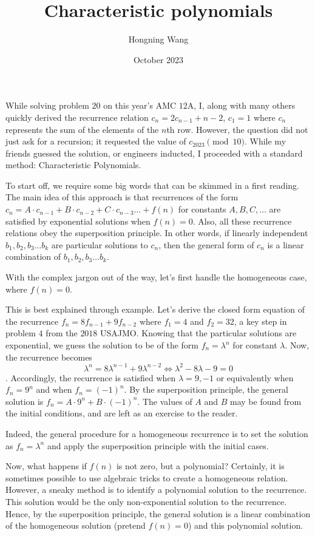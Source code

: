 \documentclass{article}
\title{Characteristic polynomials}
\author{Hongning Wang}
\date{October 2023}
\begin{document}
\maketitle

While solving problem $20$ on this year's AMC $12$A, I, along with many others quickly derived the recurrence relation $c_n = 2c_{n-1}+n-2$, $c_1 = 1$ where $c_n$ represents the sum of the elements of the $n$th row. However, the question did not just ask for a recursion; it requested the value of $c_{2023} \pmod{10}.$ While my friends guessed the solution, or engineers inducted, I proceeded with a standard method: Characteristic Polynomials.

To start off, we require some big words that can be skimmed in a first reading. The main idea of this approach is that recurrences of the form $c_n = A\cdot c_{n-1} + B \cdot c_{n-2} + C \cdot c_{n-3} \dots + f(n)$ for constants $A, B, C, \dots$ are satisfied by exponential solutions when $f(n) = 0$. Also, all these recurrence relations obey the superposition principle. In other words, if linearly independent $b_1, b_2, b_3 \dots b_k$ are particular solutions to $c_n$, then the general form of $c_n$ is a linear combination of $b_1, b_2, b_3 \dots b_k$.

With the complex jargon out of the way, let's first handle the homogeneous case, where $f(n) = 0.$ 

This is best explained through example. Let's derive the closed form equation of the recurrence $f_n = 8f_{n-1} + 9f_{n-2}$ where $f_1 = 4$ and $f_2 = 32$, a key step in problem $4$ from the $2018$ USAJMO. Knowing that the particular solutions are exponential, we guess the solution to be of the form $f_n = \lambda^n$ for constant $\lambda.$ Now, the recurrence becomes \[\lambda^n = 8\lambda^{n-1} + 9\lambda^{n-2} \Longleftrightarrow \lambda^2 - 8 \lambda - 9 = 0\]. Accordingly, the recurrence is satisfied when $\lambda = 9, -1$ or equivalently when $f_n = 9^n$ and when $f_n = (-1)^n.$ By the superposition principle, the general solution is $f_n = A \cdot 9^n + B \cdot (-1)^n.$ The values of $A$ and $B$ may be found from the initial conditions, and are left as an exercise to the reader. 

Indeed, the general procedure for a homogeneous recurrence is to set the solution as $f_n = \lambda^n$ and apply the superposition principle with the initial cases. 

Now, what happens if $f(n)$ is not zero, but a polynomial? Certainly, it is sometimes possible to use algebraic tricks to create a homogeneous relation. However, a sneaky method is to identify a polynomial solution to the recurrence. This solution would be the only non-exponential solution to the recurrence. Hence, by the superposition principle, the general solution is a linear combination of the homogeneous solution (pretend $f(n) = 0$) and this polynomial solution.
\end{document}

